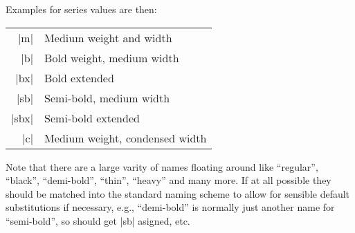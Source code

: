 \documentclass{ltxguide}[1995/11/28]
\begin{document}
\newpage

Examples for series values are then:
\begin{center}
\begin{minipage}{.7\linewidth}
   \begin{tabular}{rl}
      |m|    & Medium weight and width  \\
      |b|    & Bold weight, medium width  \\
      |bx|   & Bold extended \\
      |sb|   & Semi-bold, medium width\\
      |sbx|   & Semi-bold extended\\
      |c|    & Medium weight, condensed width
   \end{tabular}
\end{minipage}
\end{center}
Note that there are a large varity of names floating around like
``regular'', ``black'', ``demi-bold'', ``thin'', ``heavy'' and many
more. If at all possible they should be matched into the standard
naming scheme to allow for sensible default substitutions if
necessary, e.g., ``demi-bold'' is normally just another name for
``semi-bold'', so should get |sb| asigned, etc.
\end{document}
